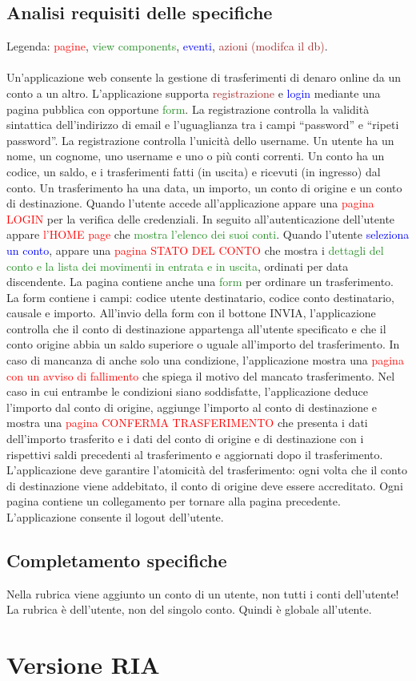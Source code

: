 \documentclass{article}
\begin{document}
\subsection{Analisi requisiti delle specifiche}
Legenda: \textcolor{red}{pagine}, \textcolor{ForestGreen}{view components}, \textcolor{blue}{eventi}, \textcolor{brown}{azioni (modifca il db)}.
\\
\\
Un’applicazione web consente la gestione di trasferimenti di denaro online da un conto a un
altro. L’applicazione supporta  \textcolor{brown}{registrazione} e  \textcolor{blue}{login} mediante una pagina pubblica con
opportune  \textcolor{ForestGreen}{form}. La registrazione controlla la validità sintattica dell’indirizzo di email e
l’uguaglianza tra i campi “password” e “ripeti password”. La registrazione controlla l’unicità
dello username. Un utente ha un nome, un cognome, uno username e uno o più conti correnti.
Un conto ha un codice, un saldo, e i trasferimenti fatti (in uscita) e ricevuti (in ingresso) dal
conto. Un trasferimento ha una data, un importo, un conto di origine e un conto di destinazione.
Quando l’utente accede all’applicazione appare una  \textcolor{red}{pagina LOGIN} per la verifica delle
credenziali. In seguito all’autenticazione dell’utente appare \textcolor{red}{l’HOME page} che \textcolor{ForestGreen}{mostra l’elenco
dei suoi conti}. Quando l’utente  \textcolor{blue}{seleziona un conto}, appare una \textcolor{red}{pagina STATO DEL CONTO}
che mostra i \textcolor{ForestGreen}{dettagli del conto e la lista dei movimenti in entrata e in uscita}, ordinati per data
discendente. La pagina contiene anche una \textcolor{ForestGreen}{form} per ordinare un trasferimento. La form
contiene i campi: codice utente destinatario, codice conto destinatario, causale e importo.
All’invio della form con il bottone INVIA, l’applicazione controlla che il conto di destinazione
appartenga all’utente specificato e che il conto origine abbia un saldo superiore o uguale
all’importo del trasferimento. In caso di mancanza di anche solo una condizione, l’applicazione
mostra una \textcolor{red}{pagina con un avviso di fallimento} che spiega il motivo del mancato trasferimento.
Nel caso in cui entrambe le condizioni siano soddisfatte, l’applicazione deduce l’importo dal
conto di origine, aggiunge l’importo al conto di destinazione e mostra una \textcolor{red}{pagina CONFERMA
TRASFERIMENTO} che presenta i dati dell’importo trasferito e i dati del conto di origine e di
destinazione con i rispettivi saldi precedenti al trasferimento e aggiornati dopo il trasferimento.
L’applicazione deve garantire l’atomicità del trasferimento: ogni volta che il conto di
destinazione viene addebitato, il conto di origine deve essere accreditato. Ogni pagina
contiene un collegamento per tornare alla pagina precedente. L’applicazione consente il
logout dell’utente.

\subsection{Completamento specifiche}
Nella rubrica viene aggiunto un conto di un utente, non tutti i conti dell'utente!
La rubrica è dell'utente, non del singolo conto. Quindi è globale all'utente.
\section{Versione RIA}
\end{document}
